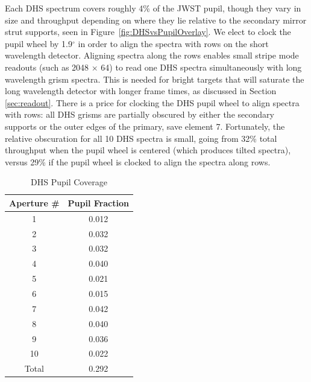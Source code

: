 \documentclass[iop]{emulateapj}
\begin{document}
Each DHS spectrum covers roughly 4\% of the JWST pupil, though they vary in size and throughput depending on where they lie relative to the secondary mirror strut supports, seen in Figure~\ref{fig:DHSvsPupilOverlay}.
We elect to clock the pupil wheel by 1.9$^\circ$ in order to align the spectra with rows on the short wavelength detector.
Aligning spectra along the rows enables small stripe mode readouts (such as 2048 $\times$ 64) to read one DHS spectra simultaneously with long wavelength grism spectra.
This is needed for bright targets that will saturate the long wavelength detector with longer frame times, as discussed in Section \ref{sec:readout}.
There is a price for clocking the DHS pupil wheel to align spectra with rows: all DHS grisms are partially obscured by either the secondary supports or the outer edges of the primary, save element 7.
Fortunately, the relative obscuration for all 10 DHS spectra is small, going from 32\% total throughput when the pupil wheel is centered (which produces tilted spectra), versus 29\% if the pupil wheel is clocked to align the spectra along rows.

\begin{table}[!b]
\centering
\caption{DHS Pupil Coverage}\label{tab:pupfrac}
\begin{tabular}{cc}
\hline \hline
Aperture \# & Pupil Fraction \\
\hline \hline
1  & 0.012 \\
2  & 0.032 \\
3  & 0.032 \\
4  & 0.040 \\
5  & 0.021 \\
6  & 0.015 \\
7  & 0.042 \\
8  & 0.040 \\
9  & 0.036 \\
10 & 0.022 \\
\hline
Total & 0.292\\
\hline
\end{tabular}
\end{table}
\end{document}
